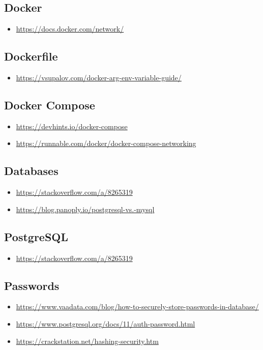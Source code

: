 \subsection[Docker]{Docker}\label{subsec:docker}
\begin{itemize}
    \item \url{https://docs.docker.com/network/}
\end{itemize}


\subsection[Dockerfile]{Dockerfile}\label{subsec:dockerfile}
\begin{itemize}
    \item \url{https://vsupalov.com/docker-arg-env-variable-guide/}
\end{itemize}

\subsection[Docker Compose]{Docker Compose}\label{subsec:docker-compose}
\begin{itemize}
    \item \url{https://devhints.io/docker-compose}
    \item \url{https://runnable.com/docker/docker-compose-networking}
\end{itemize}


\subsection[Databases]{Databases}\label{subsec:databases}
\begin{itemize}
    \item \url{https://stackoverflow.com/a/8265319}
    \item \url{https://blog.panoply.io/postgresql-vs.-mysql}
\end{itemize}


\subsection[PostgreSQL]{PostgreSQL}\label{subsec:postgresql}
\begin{itemize}
    \item \url{https://stackoverflow.com/a/8265319}
\end{itemize}


\subsection[Passwords]{Passwords}\label{subsec:passwords}
\begin{itemize}
    \item \url{https://www.vaadata.com/blog/how-to-securely-store-passwords-in-database/}
    \item \url{https://www.postgresql.org/docs/11/auth-password.html}
    \item \url{https://crackstation.net/hashing-security.htm}
\end{itemize}


